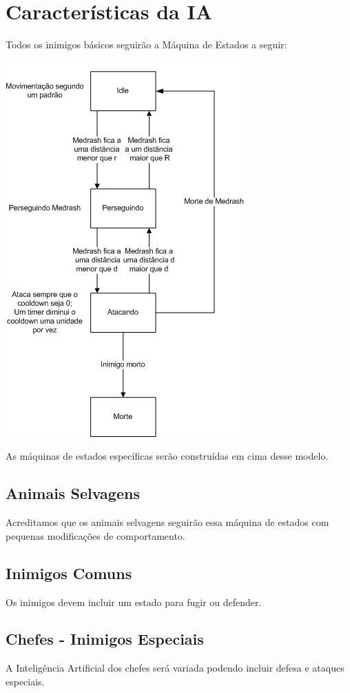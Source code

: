\documentclass[letterpaper,11pt]{article}
\begin{document}
\section{Características da IA}
 Todos os inimigos básicos seguirão a Máquina de Estados a seguir:
 \begin{center}
  \includegraphics[scale=1.2]{ia_simples.png}
 \end{center}
 As máquinas de estados específicas serão construídas em cima desse modelo.

\subsection{Animais Selvagens}
 Acreditamos que os animais selvagens seguirão essa máquina de estados com pequenas modificações de comportamento.

\subsection{Inimigos Comuns}
 Os inimigos devem incluir um estado para fugir ou defender.

\subsection{Chefes - Inimigos Especiais}
 A Inteligência Artificial dos chefes será variada podendo incluir defesa e ataques especiais.
\end{document}
